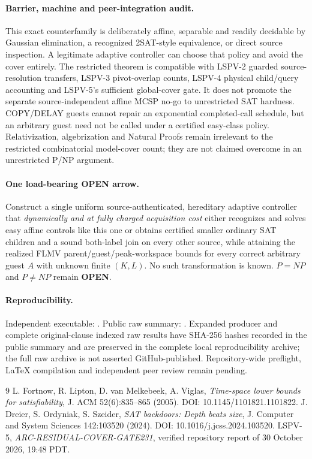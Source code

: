 \documentclass[11pt]{article}
\begin{document}
\paragraph{Barrier, machine and peer-integration audit.}
This exact counterfamily is deliberately affine, separable and readily decidable by Gaussian elimination, a recognized 2SAT-style equivalence, or direct source inspection. A legitimate adaptive controller can choose that policy and avoid the cover entirely. The restricted theorem is compatible with LSPV-2 guarded source-resolution transfers, LSPV-3 pivot-overlap counts, LSPV-4 physical child/query accounting and LSPV-5's sufficient global-cover gate. It does not promote the separate source-independent affine MCSP no-go to unrestricted SAT hardness. COPY/DELAY guests cannot repair an exponential completed-call schedule, but an arbitrary guest need not be called under a certified easy-class policy. Relativization, algebrization and Natural Proofs remain irrelevant to the restricted combinatorial model-cover count; they are not claimed overcome in an unrestricted P/NP argument.

\paragraph{One load-bearing OPEN arrow.}
Construct a single uniform source-authenticated, hereditary adaptive controller that \emph{dynamically and at fully charged acquisition cost} either recognizes and solves easy affine controls like this one or obtains certified smaller ordinary SAT children and a sound both-label join on every other source, while attaining the realized FLMV parent/guest/peak-workspace bounds for every correct arbitrary guest $A$ with unknown finite $(K,L)$. No such transformation is known. $P=NP$ and $P\ne NP$ remain \textbf{OPEN}.

\paragraph{Reproducibility.}
Independent executable: . Public raw summary: . Expanded producer and complete original-clause indexed raw results have SHA-256 hashes recorded in the public summary and are preserved in the complete local reproducibility archive; the full raw archive is not asserted GitHub-published. Repository-wide preflight, LaTeX compilation and independent peer review remain pending.

\begin{thebibliography}{9}
 L. Fortnow, R. Lipton, D. van Melkebeek, A. Viglas, \emph{Time-space lower bounds for satisfiability}, J. ACM 52(6):835--865 (2005). DOI: 10.1145/1101821.1101822.
 J. Dreier, S. Ordyniak, S. Szeider, \emph{SAT backdoors: Depth beats size}, J. Computer and System Sciences 142:103520 (2024). DOI: 10.1016/j.jcss.2024.103520.
 LSPV-5, \emph{ARC-RESIDUAL-COVER-GATE231}, verified repository report of 30 October 2026, 19:48 PDT.
\end{thebibliography}
\end{document}
